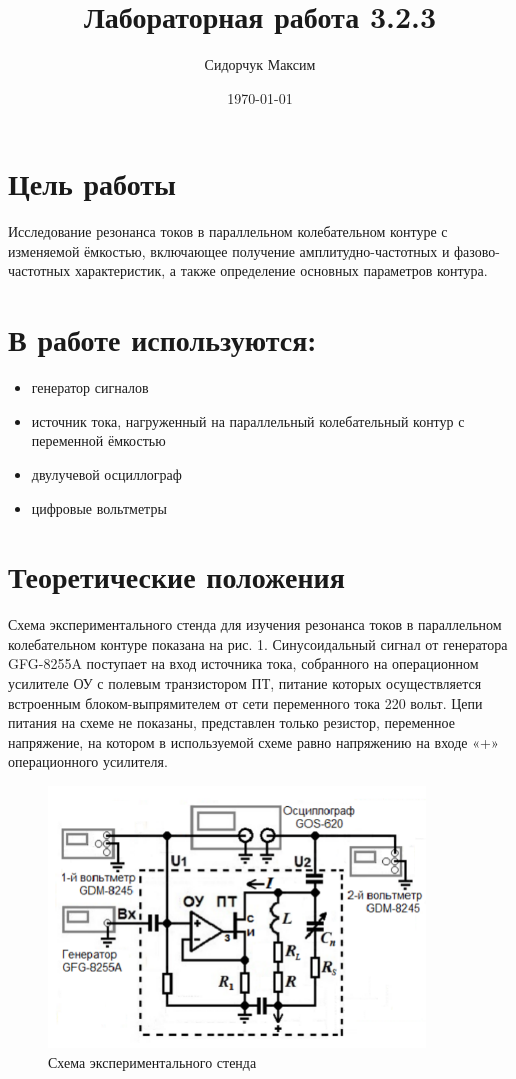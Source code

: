 \documentclass[a4paper]{article}
\date{\today}
\title{Лабораторная работа 3.2.3}
\author{Сидорчук Максим}
\begin{document}
\maketitle

\section{Цель работы}

Исследование резонанса токов в параллельном колебательном контуре с изменяемой ёмкостью, включающее получение амплитудно-частотных и фазово-частотных характеристик, а также определение основных параметров контура.

\section{В работе используются:}
\begin{itemize}
    \item генератор сигналов
    \item источник тока, нагруженный на параллельный колебательный контур с переменной ёмкостью
    \item двулучевой осциллограф
    \item цифровые вольтметры
\end{itemize}


\section{Теоретические положения}

Схема экспериментального стенда для изучения резонанса токов в параллельном колебательном контуре показана на рис. 1. Синусоидальный сигнал от генератора GFG-8255A поступает на вход источника тока, собранного на операционном усилителе ОУ с полевым транзистором ПТ, питание которых осуществляется встроенным блоком-выпрямителем от сети переменного тока 220 вольт. Цепи питания на схеме не показаны, представлен только резистор, переменное напряжение, на котором в используемой схеме равно напряжению на входе «+» операционного усилителя. \\

\begin{figure}[h]
    \centering
    \includegraphics[width=10cm]{fig1.PNG}
    \caption{Схема экспериментального стенда}
    \label{fig:vac}
\end{figure}
\end{document}
